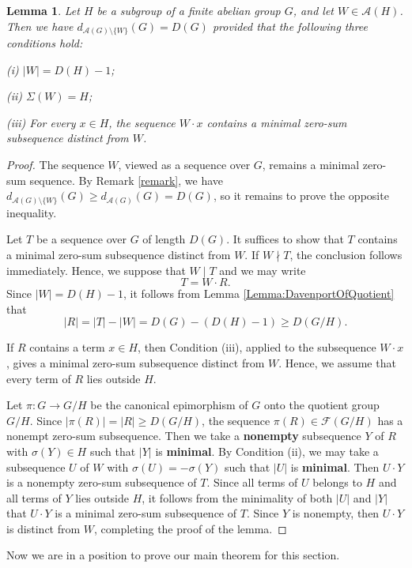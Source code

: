 \documentclass[a4paper, 12pt]{article}
\newtheorem{lemma}[theorem]{Lemma}
\begin{document}
\begin{lemma}\label{Lemma:lifting}
Let $H$ be a subgroup of a finite abelian group $G$, and let
$W\in\mathcal{A}(H)$.  Then we have $d_{\mathcal A(G)\setminus\{W\}}(G)=D(G)$ provided that the following three conditions hold:

(i) $|W|=D(H)-1$;

(ii) $\Sigma(W)=H$;

(iii) For every $x\in H$, the sequence $W\cdot x$ contains a minimal zero-sum subsequence distinct
      from $W$.
\end{lemma}

\begin{proof}
The sequence $W$, viewed as a sequence over $G$, remains a minimal zero-sum sequence.  By Remark \ref{remark}, we have
$d_{\mathcal A(G)\setminus\{W\}}(G)\geq  d_{\mathcal A(G)}(G)=D(G)$, so it remains to prove the opposite inequality.

Let $T$ be a sequence over $G$ of length $D(G)$.  It suffices to show that $T$ contains a minimal zero-sum subsequence distinct from $W$.
If $W\nmid T$, the conclusion follows immediately. Hence, we suppose that $W\mid T$ and we may
write $$T=W\cdot R.$$
Since $|W|=D(H)-1$, it follows from Lemma \ref{Lemma:DavenportOfQuotient} that
$$|R|=|T|-|W|=D(G)-(D(H)-1)\geq D(G/H).$$

If $R$ contains a term $x\in H$, then Condition (iii), applied to the
subsequence $W\cdot x$, gives a minimal zero-sum subsequence distinct from $W$. Hence, we assume that every term of $R$ lies outside $H$.

Let
$\pi:G\to G/H$ be the canonical epimorphism of $G$ onto the quotient group $G/H$.
Since $|\pi(R)|=|R|\geq D(G/H)$, the sequence
$\pi(R)\in \mathcal{F}(G/H)$ has a nonempt zero-sum subsequence. Then we take a {\bf nonempty} subsequence $Y$ of $R$ with $\sigma(Y)\in H$ such that  $|Y|$ is {\bf minimal}.
By Condition (ii), we may take a subsequence $U$ of $W$ with $\sigma(U)=-\sigma(Y)$ such that $|U|$ is {\bf minimal}. Then $U\cdot Y$ is
a nonempty zero-sum subsequence of $T$. Since all terms of $U$ belongs to $H$ and all terms of $Y$ lies outside $H$, it follows from the minimality of both $|U|$ and $|Y|$ that $U\cdot Y$ is a minimal zero-sum subsequence of $T$. Since $Y$ is nonempty, then $U\cdot Y$ is distinct from $W$, completing the proof of the lemma.
\end{proof}




Now we are in a position to prove our main theorem for this section.
\end{document}
